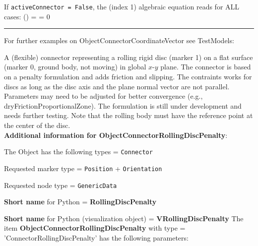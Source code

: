     If \texttt{activeConnector = False}, the (index 1) algebraic equation reads for ALL cases:
    \be
      \cv(\tlambda) = \tlambda = 0
    \ee
\vspace{6pt}\par\noindent\rule{\textwidth}{0.4pt}
%
\noindent For further examples on ObjectConnectorCoordinateVector see TestModels:
\bi
\item{}\ei

%
\newpage

\label{sec:item:ObjectConnectorRollingDiscPenalty}
A (flexible) connector representing a rolling rigid disc (marker 1) on a flat surface (marker 0, ground body, not moving) in global $x$-$y$ plane. The connector is based on a penalty formulation and adds friction and slipping. The contraints works for discs as long as the disc axis and the plane normal vector are not parallel. Parameters may need to be adjusted for better convergence (e.g., dryFrictionProportionalZone). The formulation is still under development and needs further testing. Note that the rolling body must have the reference point at the center of the disc.\vspace{12pt}
 \\{\bf Additional information for ObjectConnectorRollingDiscPenalty}:
\bi
  \item The Object has the following types = \texttt{Connector}
  \item Requested marker type = \texttt{Position} + \texttt{Orientation}
  \item Requested node type = \texttt{GenericData}
  \item {\bf Short name} for Python = {\bf RollingDiscPenalty}  \item {\bf Short name} for Python (visualization object) = {\bf VRollingDiscPenalty}\ei
\vspace{12pt} \noindent The item {\bf ObjectConnectorRollingDiscPenalty} with type = 'ConnectorRollingDiscPenalty' has the following parameters:\vspace{-1cm}\\ 
